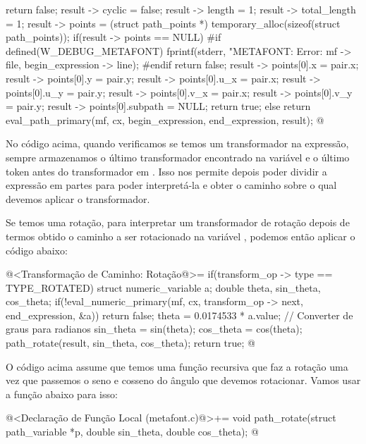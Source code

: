 {{{      return false;
    result -> cyclic = false;
    result -> length = 1;
    result -> total_length = 1;
    result -> points = (struct path_points *)
                         temporary_alloc(sizeof(struct path_points));
    if(result -> points == NULL){
#if defined(W_DEBUG_METAFONT)
      fprintf(stderr, "METAFONT: Error: %
              mf -> file, begin_expression -> line);
#endif
      return false;
    }
    result -> points[0].x = pair.x;
    result -> points[0].y = pair.y;
    result -> points[0].u_x = pair.x;
    result -> points[0].u_y = pair.y;
    result -> points[0].v_x = pair.x;
    result -> points[0].v_y = pair.y;
    result -> points[0].subpath = NULL;
    return true;    
  }
  else
    return eval_path_primary(mf, cx, begin_expression, end_expression,
                             result);
}
@
\fimcodigo

No código acima, quando verificamos se temos um transformador na
expressão, sempre armazenamos o último transformador encontrado na
variável  e o último token antes do
transformador em . Isso nos permite
depois poder dividir a expressão em partes para poder interpretá-la e
obter o caminho sobre o qual devemos aplicar o transformador.

Se temos uma rotação, para interpretar um transformador de rotação
depois de termos obtido o caminho a ser rotacionado na
variável , podemos então aplicar o código abaixo:

\iniciocodigo
@<Transformação de Caminho: Rotação@>=
if(transform_op -> type == TYPE_ROTATED){
  struct numeric_variable a;
  double theta, sin_theta, cos_theta;
  if(!eval_numeric_primary(mf, cx, transform_op -> next, end_expression,
                          &a))
    return false;
  theta = 0.0174533 * a.value; // Converter de graus para radianos
  sin_theta = sin(theta);
  cos_theta = cos(theta);
  path_rotate(result, sin_theta, cos_theta);
  return true;
}
@
\fimcodigo

O código acima assume que temos uma função recursiva que faz a rotação
uma vez que passemos o seno e cosseno do ângulo que devemos
rotacionar. Vamos usar a função abaixo para isso:


\iniciocodigo
@<Declaração de Função Local (metafont.c)@>+=
void path_rotate(struct path_variable *p, double sin_theta,
                 double cos_theta);
@
\fimcodigo

}

